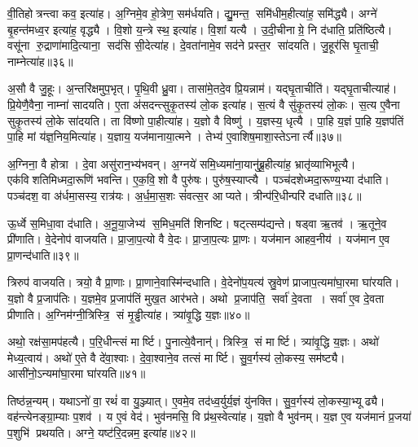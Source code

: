 वी॒तिहोत्रन्त्वा कव॒ इत्या॑ह।
अ॒ग्निमे॒व हो॒त्रेण॒ सम॑र्धयति।
द्यु॒मन्त॒ समि॑धीम॒हीत्या॑ह॒ समि॑द्ध्यै।
अग्ने॑ बृ॒हन्त॑मध्व॒र इत्या॑ह॒ वृद्ध्यै।
वि॒शो य॒न्त्रे स्थ॒ इत्या॑ह।
वि॒शां यत्यै।
उ॒दी॒चीनाग्रे॒ नि द॑धाति॒ प्रति॑ष्ठित्यै।
वसू॑ना रु॒द्राणा॑मादि॒त्याना॒ सद॑सि सी॒देत्या॑ह।
दे॒वता॑नामे॒व सद॑ने प्रस्त॒र सा॑दयति।
जु॒हूर॑सि घृ॒ताची॒ नाम्नेत्या॑ह॥३६॥

अ॒सौ वै जु॒हूः।
अ॒न्तरि॑क्षमुप॒भृत्।
पृ॒थि॒वी ध्रु॒वा।
तासा॑मे॒तदे॒व प्रि॒यन्नाम॑।
यद्घृ॒ताचीति॑।
यद्घृ॒ताचीत्याह॑।
प्रि॒येणै॒वैना॒ नाम्ना॑ सादयति।
ए॒ता अ॑सदन्त्सुकृ॒तस्य॑ लो॒क इत्या॑ह।
स॒त्यं वै सु॑कृ॒तस्य॑ लो॒कः।
स॒त्य ए॒वैना सुकृ॒तस्य॑ लो॒के सा॑दयति।
ता वि॑ष्णो पा॒हीत्या॑ह।
य॒ज्ञो वै विष्णु॑।
य॒ज्ञस्य॒ धृत्यै।
पा॒हि य॒ज्ञं पा॒हि य॒ज्ञप॑तिं पा॒हि मां य॑ज्ञ॒निय॒मित्या॑ह।
य॒ज्ञाय॒ यज॑मानाया॒त्मने।
तेभ्य॑ ए॒वाशिष॒माशा॒स्तेऽनार्त्यै॥३७॥\anuvakamend[स्थेत्या॑ह पृथि॒वी वेदि॒र्यन्ति॑ क्रि॒यते॒ वीणु॑र्वी॒र्य॑सम्मितं करोत्याह पाति॒ नाम्नेत्या॑ह लो॒के सा॑दयति॒ षट् च॑]

अ॒ग्निना॒ वै होत्रा।
दे॒वा असु॑रान॒भ्य॑भवन्।
अ॒ग्नये॑ समि॒ध्यमा॑ना॒यानु॑ब्रू॒हीत्या॑ह॒ भ्रातृ॑व्याभिभूत्यै।
एक॑विशतिमिध्मदा॒रूणि॑ भवन्ति।
ए॒क॒वि॒शो वै पुरु॑षः।
पुरु॑ष॒स्याप्त्यै।
पञ्च॑दशेध्मदा॒रूण्य॒भ्या द॑धाति।
पञ्च॑दश॒ वा अ॑र्धमा॒सस्य॒ रात्र॑यः।
अ॒र्ध॒मा॒स॒शः सं॑वत्स॒र आप्यते।
त्रीन्प॑रि॒धीन्परि॑ दधाति॥३८॥

ऊ॒र्ध्वे स॒मिधा॒वा द॑धाति।
अ॒नू॒या॒जेभ्य॑ स॒मिध॒मति॑ शिनष्टि।
षट्त्सम्प॑द्यन्ते।
षड्वा ऋ॒तव॑।
ऋ॒तूने॒व प्री॑णाति।
वे॒देनोप॑ वाजयति।
प्रा॒जा॒प॒त्यो वै वे॒दः।
प्रा॒जा॒प॒त्यः प्रा॒णः।
यज॑मान आहव॒नीय॑।
यज॑मान ए॒व प्रा॒णन्द॑धाति॥३९॥

त्रिरुप॑ वाजयति।
त्रयो॒ वै प्रा॒णाः।
प्रा॒णाने॒वास्मि॑न्दधाति।
वे॒देनो॑प॒यत्य॑ स्रु॒वेण॑ प्राजाप॒त्यमा॑घा॒रमा घा॑रयति।
य॒ज्ञो वै प्र॒जाप॑तिः।
य॒ज्ञमे॒व प्र॒जाप॑तिं मुख॒त आर॑भते।
अथो प्र॒जाप॑ति॒ सर्वा॑ दे॒वता।
सर्वा॑ ए॒व दे॒वता प्रीणाति।
अ॒ग्निम॑ग्नी॒त्रिस्त्रि॒ सं मृ॒ड्ढीत्या॑ह।
त्र्या॑वृ॒द्धि य॒ज्ञः॥४०॥

अथो॒ रक्ष॑सा॒मप॑हत्यै।
प॒रि॒धीन्त्सं मार्ष्टि।
पु॒नात्ये॒वैनान्॑।
त्रिस्त्रि॒ सं मार्ष्टि।
त्र्या॑वृ॒द्धि य॒ज्ञः।
अथो॑ मेध्य॒त्वाय॑।
अथो॑ ए॒ते वै दे॑वा॒श्वाः।
दे॒वा॒श्वाने॒व तत्सं मार्ष्टि।
सु॒व॒र्गस्य॑ लो॒कस्य॒ सम॑ष्ट्यै।
आसी॑नो॒ऽन्यमा॑घा॒रमा घा॑रयति॥४१॥

तिष्ठ॑न्न॒न्यम्।
यथाऽनो॑ वा॒ रथं॑ वा यु॒ञ्ज्यात्।
ए॒वमे॒व तद॑ध्व॒र्युर्य॒ज्ञं यु॑नक्ति।
सु॒व॒र्गस्य॑ लो॒कस्या॒भ्यूढ्यै।
वह॑न्त्येनङ्ग्रा॒म्याः प॒शव॑।
य ए॒वं वेद॑।
भुव॑नमसि॒ वि प्र॑थ॒स्वेत्या॑ह।
य॒ज्ञो वै भुव॑नम्।
य॒ज्ञ ए॒व यज॑मानं प्र॒जया॑ प॒शुभि॑ प्रथयति।
अग्ने॒ यष्ट॑रि॒दन्नम॒ इत्या॑ह॥४२॥

